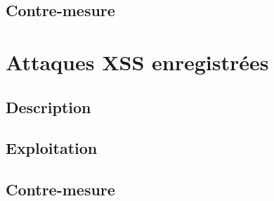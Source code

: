 \subsection{Contre-mesure}


\section{Attaques XSS enregistrées }

\subsection{Description}

\subsection{Exploitation}

\subsection{Contre-mesure}

